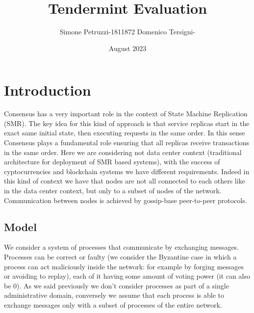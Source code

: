 \documentclass{article}
\title{Tendermint Evaluation}
\author{Simone Petruzzi-1811872 Domenico Tersigni-}
\date{August 2023}
\begin{document}
   \maketitle
   \section{Introduction}
   Consensus has a very important role in the context of State Machine Replication (SMR). The key idea for this kind of approach is that service replicas start in the exact same initial state, then executing requests in the same order. In this sense Consensus plays a fundamental role ensuring that all replicas receive transactions in the same order.
   \newline
   \newline
   Here we are considering not data center context (traditional architecture for deployment of SMR based systems), with the success of cyptocurrencies and blockchain systems we have different requirements. Indeed in this kind of context we have that nodes are not all connected to each others like in the data center context, but only to a subset of nodes of the network. Communication between nodes is achieved by gossip-base peer-to-peer protocols.
   \subsection{Model}
   We consider a system of processes that communicate by exchanging messages. Processes can be correct or faulty (we consider the Byzantine case in which a process can act maliciously inside the network: for example by forging messages or avoiding to replay), each of it having some amount of voting power (it can also be 0). As we said previously we don't consider processes as part of a single administrative domain, conversely we assume that each process is able to exchange messages only with a subset of processes of the entire network.
\end{document}
